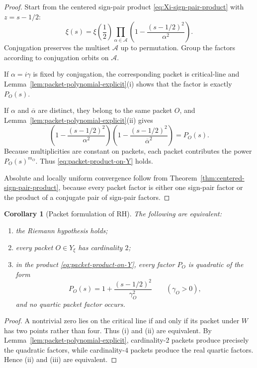 \documentclass[11pt,a4paper]{article}
\newtheorem{corollary}[theorem]{Corollary}
\theoremstyle{definition}
\theoremstyle{remark}
\begin{document}
\begin{proof}
Start from the centered sign-pair product \eqref{eq:Xi-sign-pair-product} with $z=s-1/2$:
\[
\xi(s)=\xi\!\left(\frac12\right)\prod_{\alpha\in\mathcal A}\left(1-\frac{(s-1/2)^2}{\alpha^2}\right).
\]
Conjugation preserves the multiset $\mathcal A$ up to permutation.  Group the factors according to conjugation orbits on $\mathcal A$.

If $\alpha=i\gamma$ is fixed by conjugation, the corresponding packet is critical-line and Lemma~\ref{lem:packet-polynomial-explicit}(i) shows that the factor is exactly $P_O(s)$.

If $\alpha$ and $\overline\alpha$ are distinct, they belong to the same packet $O$, and Lemma~\ref{lem:packet-polynomial-explicit}(ii) gives
\[
\left(1-\frac{(s-1/2)^2}{\alpha^2}\right)
\left(1-\frac{(s-1/2)^2}{\overline\alpha^2}\right)
=P_O(s).
\]
Because multiplicities are constant on packets, each packet contributes the power $P_O(s)^{m_O}$.  Thus \eqref{eq:packet-product-on-Y} holds.

Absolute and locally uniform convergence follow from Theorem~\ref{thm:centered-sign-pair-product}, because every packet factor is either one sign-pair factor or the product of a conjugate pair of sign-pair factors.
\end{proof}

\begin{corollary}[Packet formulation of RH]\label{cor:RH-packet-criterion}
The following are equivalent:
\begin{enumerate}[label=(\roman*)]
\item the Riemann hypothesis holds;
\item every packet $O\in Y_\xi$ has cardinality $2$;
\item in the product \eqref{eq:packet-product-on-Y}, every factor $P_O$ is quadratic of the form
\[
P_O(s)=1+\frac{(s-1/2)^2}{\gamma_O^2}
\qquad (\gamma_O>0),
\]
and no quartic packet factor occurs.
\end{enumerate}
\end{corollary}

\begin{proof}
A nontrivial zero lies on the critical line if and only if its packet under $W$ has two points rather than four.  Thus (i) and (ii) are equivalent.  By Lemma~\ref{lem:packet-polynomial-explicit}, cardinality-$2$ packets produce precisely the quadratic factors, while cardinality-$4$ packets produce the real quartic factors.  Hence (ii) and (iii) are equivalent.
\end{proof}
\end{document}
